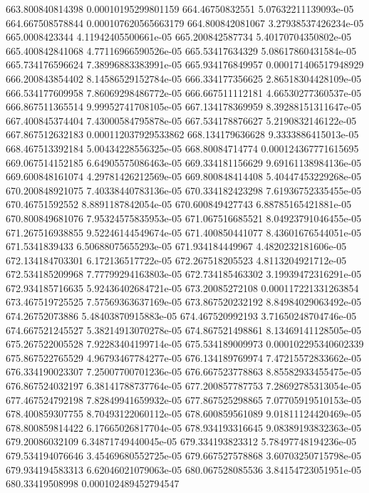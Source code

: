 {663.800840814398 0.00010195299801159
664.46750832551 5.07632211139093e-05
664.667508578844 0.000107620565663179
664.800842081067 3.27938537426234e-05
665.0008423344 4.11942405500661e-05
665.200842587734 5.40170704350802e-05
665.400842841068 4.77116966590526e-05
665.53417634329 5.08617860431584e-05
665.734176596624 7.38996883383991e-05
665.934176849957 0.000171406517948929
666.200843854402 8.14586529152784e-05
666.334177356625 2.86518304428109e-05
666.534177609958 7.86069298486772e-05
666.667511112181 4.66530277360537e-05
666.867511365514 9.99952741708105e-05
667.134178369959 8.39288151311647e-05
667.400845374404 7.43000584795878e-05
667.534178876627 5.2190832146122e-05
667.867512632183 0.000112037929533862
668.134179636628 9.3333886415013e-05
668.467513392184 5.00434228556325e-05
668.80084714774 0.000124367771615695
669.067514152185 6.64905575086463e-05
669.334181156629 9.69161138984136e-05
669.600848161074 4.29781426212569e-05
669.800848414408 5.40447453229268e-05
670.200848921075 7.40338440783136e-05
670.334182423298 7.61936752335455e-05
670.46751592552 8.8891187842054e-05
670.600849427743 6.88785165421881e-05
670.800849681076 7.95324575835953e-05
671.067516685521 8.04923791046455e-05
671.267516938855 9.52246144549674e-05
671.400850441077 8.43601676544051e-05
671.5341839433 6.50688075655293e-05
671.934184449967 4.4820232181606e-05
672.134184703301 6.172136517722e-05
672.267518205523 4.8113204921712e-05
672.534185209968 7.77799294163803e-05
672.734185463302 3.19939472316291e-05
672.934185716635 5.92436402684721e-05
673.20085272108 0.000117221331263854
673.467519725525 7.57569363637169e-05
673.867520232192 8.84984029063492e-05
674.26752073886 5.48403870915883e-05
674.467520992193 3.71650248704746e-05
674.667521245527 5.38214913070278e-05
674.867521498861 8.13469141128505e-05
675.267522005528 7.92283404199714e-05
675.534189009973 0.000102295340602339
675.867522765529 4.96793467784277e-05
676.134189769974 7.47215572833662e-05
676.334190023307 7.25007700701236e-05
676.667523778863 8.85582933455475e-05
676.867524032197 6.38141788737764e-05
677.200857787753 7.28692785313054e-05
677.467524792198 7.82849941659932e-05
677.867525298865 7.07705919510153e-05
678.400859307755 8.70493122060112e-05
678.600859561089 9.01811124420469e-05
678.800859814422 6.17665026817704e-05
678.934193316645 9.08389193832363e-05
679.20086032109 6.34871749440045e-05
679.334193823312 5.78497748194236e-05
679.534194076646 3.45469680552725e-05
679.667527578868 3.60703250715798e-05
679.934194583313 6.62046021079063e-05
680.067528085536 3.84154723051951e-05
680.33419508998 0.000102489452794547
}
